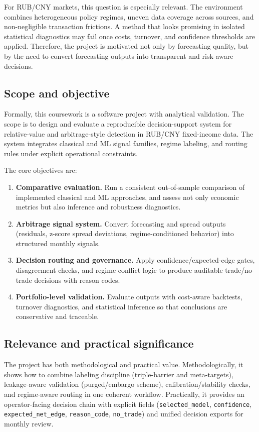 \documentclass[a4paper,12pt]{extarticle}
\begin{document}
For RUB/CNY markets, this question is especially relevant. The environment combines heterogeneous policy regimes, uneven data coverage across sources, and non-negligible transaction frictions. A method that looks promising in isolated statistical diagnostics may fail once costs, turnover, and confidence thresholds are applied. Therefore, the project is motivated not only by forecasting quality, but by the need to convert forecasting outputs into transparent and risk-aware decisions.

\subsection{Scope and objective}

Formally, this coursework is a software project with analytical validation. The scope is to design and evaluate a reproducible decision-support system for relative-value and arbitrage-style detection in RUB/CNY fixed-income data. The system integrates classical and ML signal families, regime labeling, and routing rules under explicit operational constraints.

The core objectives are:
\begin{enumerate}[leftmargin=*, itemsep=0.3em]
\item \textbf{Comparative evaluation.} Run a consistent out-of-sample comparison of implemented classical and ML approaches, and assess not only economic metrics but also inference and robustness diagnostics.
\item \textbf{Arbitrage signal system.} Convert forecasting and spread outputs (residuals, z-score spread deviations, regime-conditioned behavior) into structured monthly signals.
\item \textbf{Decision routing and governance.} Apply confidence/expected-edge gates, disagreement checks, and regime conflict logic to produce auditable trade/no-trade decisions with reason codes.
\item \textbf{Portfolio-level validation.} Evaluate outputs with cost-aware backtests, turnover diagnostics, and statistical inference so that conclusions are conservative and traceable.
\end{enumerate}

\subsection{Relevance and practical significance}

The project has both methodological and practical value. Methodologically, it shows how to combine labeling discipline (triple-barrier and meta-targets), leakage-aware validation (purged/embargo scheme), calibration/stability checks, and regime-aware routing in one coherent workflow. Practically, it provides an operator-facing decision chain with explicit fields (\texttt{selected\_model}, \texttt{confidence}, \texttt{expected\_net\_edge}, \texttt{reason\_code}, \texttt{no\_trade}) and unified decision exports for monthly review.
\end{document}
